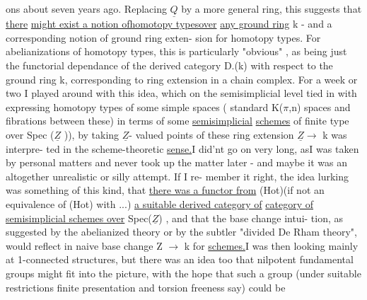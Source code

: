 
ons about seven years ago.  Replacing $\underline{Q}$ by a more general ring,  this
suggests that \uline{there}  \uline{might exist a notion ofhomotopy typesover}
\uline{any ground ring}  k  -  and a corresponding notion of ground ring exten-%
sion for homotopy types.  For abelianizations of homotopy types,  this
is particularly "obvious" ,  as  being just the functorial dependance
of the derived category  D.(k)  with respect to the ground ring k,
corresponding to ring extension in a chain complex.  For a  week or
two I played around with this idea,  which on the semisimplicial level
tied in with expressing homotopy types of some simple spaces (
standard K($\pi$,n) spaces and fibrations between these) in terms of some
 \uline{semisimplicial} \uline{schemes}  of finite type over Spec ($\underline{Z}$ )),  by taking $\underline{Z}$-%
valued points of these\over{,}{\unsure{;}}  ring extension  $\underline{Z} \longrightarrow$ k  was interpre-%
ted in the scheme-theoretic \uline{sense.}\margin{$\rfloor\!\lceil$}I did'nt go on very long,  asI was
 taken by personal matters and never took up the matter later  -
and maybe it was an altogether unrealistic or silly attempt.  If I re-%
member it right,  the idea lurking was  something of this
kind,  that \uline{there was a functor from} (Hot)(if not an equivalence of
(Hot) with ...)   \uline{a suitable derived category of}  \uline{category of}
\uline{semisimplicial schemes  over} Spec($\underline{Z}$) ,  and that the base change intui-%
tion,  as suggested by the abelianized theory or by the subtler "divided
 De Rham theory",  would reflect in naive base change  Z $\longrightarrow$ k  for
\uline{schemes.}\margin{$\rfloor\!\lceil$}I was then looking mainly at 1-connected structures,  but there
was an idea too that nilpotent fundamental groups might fit into the
picture,  with the hope that such a group (under suitable restrictions\hand{,}
 finite presentation and torsion freeness say)  could be 
